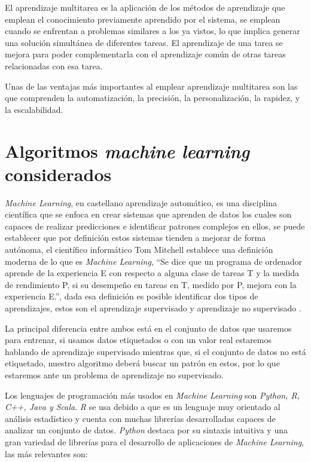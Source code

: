 El aprendizaje multitarea es la aplicación de los métodos de aprendizaje que emplean el conocimiento previamente aprendido por el sistema, se emplean cuando se enfrentan a problemas similares a los ya vistos, lo que implica generar una solución simultánea de diferentes tareas. El aprendizaje de una tarea se mejora para poder complementarla con el aprendizaje común de otras tareas relacionadas con esa tarea.

Unas de las ventajas más importantes al emplear aprendizaje multitarea son las que comprenden la automatización, la precisión, la personalización, la rapidez, y la escalabilidad.


\section{Algoritmos \textit{machine learning} considerados}

\textit{Machine Learning}, en castellano aprendizaje automático, es una disciplina científica que se enfoca en crear sistemas que aprenden de datos los cuales son capaces de realizar predicciones e identificar patrones complejos en ellos, se puede establecer que por definición estos sistemas tienden a mejorar de forma autónoma, el científico informático Tom Mitchell establece una definición moderna de lo que es \textit{Machine Learning}, “Se dice que un programa de ordenador aprende de la experiencia E con respecto a alguna clase de tareas T y la medida de rendimiento P, si su desempeño en tareas en T, medido por P, mejora con la experiencia E.”, dada esa definición es posible identificar dos tipos de aprendizajes, estos son el aprendizaje supervisado y aprendizaje no supervisado \cite{RodriguezGonzalez2018}. 

La principal diferencia entre ambos está en el conjunto de datos que usaremos para entrenar, si usamos datos etiquetados o con un valor real estaremos hablando de aprendizaje supervisado mientras que, si el conjunto de datos no está etiquetado, nuestro algoritmo deberá buscar un patrón en estos, por lo que estaremos ante un problema de aprendizaje no supervisado.

Los lenguajes de programación más usados en \textit{Machine Learning} son \textit{Python, R, C++, Java y Scala}. \textit{R} se usa debido a que es un lenguaje muy orientado al análisis estadístico y cuenta con muchas librerías desarrolladas capaces de analizar un conjunto de datos. \textit{Python} destaca por su sintaxis intuitiva y una gran variedad de librerías para el desarrollo de aplicaciones de \textit{Machine Learning}, las más relevantes son: 

